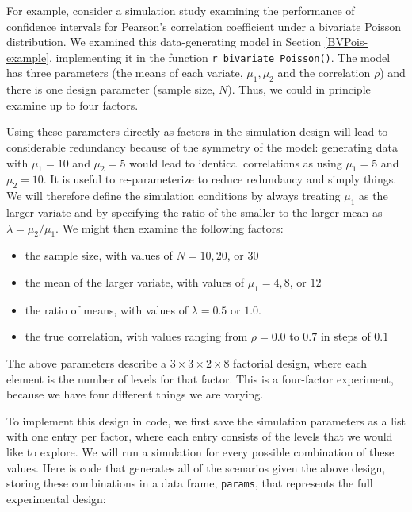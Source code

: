 \documentclass[
]{book}
\providecommand{\tightlist}{%
  \setlength{\itemsep}{0pt}\setlength{\parskip}{0pt}}
\begin{document}
For example, consider a simulation study examining the performance of confidence intervals for Pearson's correlation coefficient under a bivariate Poisson distribution.
We examined this data-generating model in Section \ref{BVPois-example}, implementing it in the function \texttt{r\_bivariate\_Poisson()}. The model has three parameters (the means of each variate, \(\mu_1, \mu_2\) and the correlation \(\rho\)) and there is one design parameter (sample size, \(N\)).
Thus, we could in principle examine up to four factors.

Using these parameters directly as factors in the simulation design will lead to considerable redundancy because of the symmetry of the model: generating data with \(\mu_1 = 10\) and \(\mu_2 = 5\) would lead to identical correlations as using \(\mu_1 = 5\) and \(\mu_2 = 10\).
It is useful to re-parameterize to reduce redundancy and simply things.
We will therefore define the simulation conditions by always treating \(\mu_1\) as the larger variate and by specifying the ratio of the smaller to the larger mean as \(\lambda = \mu_2 / \mu_1\).
We might then examine the following factors:

\begin{itemize}
\tightlist
\item
  the sample size, with values of \(N = 10, 20\), or \(30\)
\item
  the mean of the larger variate, with values of \(\mu_1 = 4, 8\), or \(12\)
\item
  the ratio of means, with values of \(\lambda = 0.5\) or \(1.0\).
\item
  the true correlation, with values ranging from \(\rho = 0.0\) to \(0.7\) in steps of \(0.1\)
\end{itemize}

The above parameters describe a \(3 \times 3 \times 2 \times 8\) factorial design, where each element is the number of levels for that factor. This is a four-factor experiment, because we have four different things we are varying.

To implement this design in code, we first save the simulation parameters as a list with one entry per factor, where each entry consists of the levels that we would like to explore.
We will run a simulation for every possible combination of these values.
Here is code that generates all of the scenarios given the above design, storing these combinations in a data frame, \texttt{params}, that represents the full experimental design:
\end{document}
